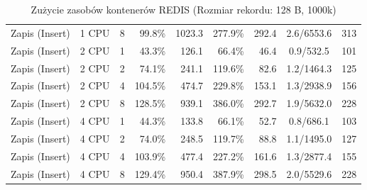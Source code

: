 \begin{table}[ht]
{\begin{tabular}{llcrrrrcc}
Zapis (Insert) & 1 CPU & 8 & 99.8\% & 1023.3 & 277.9\% & 292.4 & 2.6/6553.6 & 313 \\
Zapis (Insert) & 2 CPU & 1 & 43.3\% & 126.1 & 66.4\% & 46.4 & 0.9/532.5 & 101 \\
Zapis (Insert) & 2 CPU & 2 & 74.1\% & 241.1 & 119.6\% & 82.6 & 1.2/1464.3 & 125 \\
Zapis (Insert) & 2 CPU & 4 & 104.5\% & 474.7 & 229.8\% & 153.1 & 1.3/2938.9 & 156 \\
Zapis (Insert) & 2 CPU & 8 & 128.5\% & 939.1 & 386.0\% & 292.7 & 1.9/5632.0 & 228 \\
Zapis (Insert) & 4 CPU & 1 & 44.3\% & 133.8 & 66.1\% & 52.7 & 0.8/686.1 & 103 \\
Zapis (Insert) & 4 CPU & 2 & 74.0\% & 248.5 & 119.7\% & 88.8 & 1.1/1495.0 & 127 \\
Zapis (Insert) & 4 CPU & 4 & 103.9\% & 477.4 & 227.2\% & 161.6 & 1.3/2877.4 & 155 \\
Zapis (Insert) & 4 CPU & 8 & 129.4\% & 950.4 & 387.9\% & 298.5 & 2.0/5529.6 & 228 \\
\bottomrule
\end{tabular}%
}
\caption{Zużycie zasobów kontenerów REDIS (Rozmiar rekordu: 128 B, 1000k)}
\label{tab:resources_redis_small_1000000}
\end{table}

